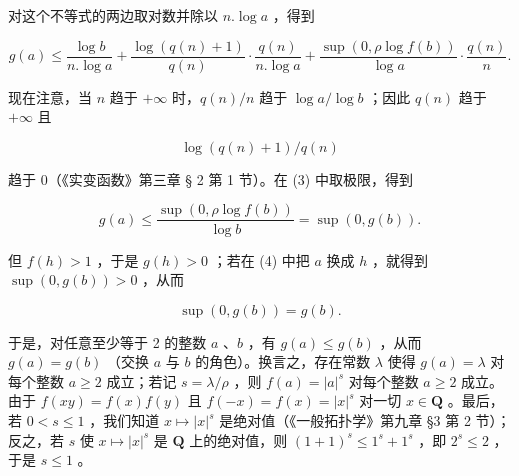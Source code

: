 对这个不等式的两边取对数并除以 \(n.\log a\) ，得到

\[
g (a) \leqslant \frac {\log b}{n . \log a} + \frac {\log (q (n) + 1)}{q (n)} \cdot \frac {q (n)}{n . \log a} + \frac {\sup (0 , \rho \log f (b))}{\log a} \cdot \frac {q (n)}{n}.\tag{3}
\]

现在注意，当 \(n\) 趋于 \(+\infty\) 时，\(q(n) / n\) 趋于 \(\log a / \log b\) ；因此 \(q(n)\) 趋于 \(+\infty\) 且

\[
\log (q (n) + 1) / q (n)
\]

趋于 0（《实变函数》第三章 § 2 第 1 节）。在 (3) 中取极限，得到

\[
g (a) \leqslant \frac {\sup (0 , \rho \log f (b))}{\log b} = \sup (0, g (b)).\tag{4}
\]

但 \(f(h) > 1\) ，于是 \(g(h) > 0\) ；若在 (4) 中把 \(a\) 换成 \(h\) ，就得到 \(\sup(0, g(b)) > 0\) ，从而

\[
\sup (0, g (b)) = g (b).
\]

于是，对任意至少等于 2 的整数 \(a\) 、\(b\) ，有 \(g(a) \leqslant g(b)\) ，从而 \(g(a) = g(b)\) （交换 \(a\) 与 \(b\) 的角色）。换言之，存在常数 \(\lambda\) 使得 \(g(a) = \lambda\) 对每个整数 \(a \geqslant 2\) 成立；若记 \(s = \lambda / \rho\) ，则 \(f(a) = |a|^s\) 对每个整数 \(a \geqslant 2\) 成立。由于 \(f(xy) = f(x)f(y)\) 且 \(f(-x) = f(x) = |x|^s\) 对一切 \(x \in \mathbf{Q}\) 。最后，若 \(0 < s \leqslant 1\) ，我们知道 \(x \mapsto |x|^s\) 是绝对值（《一般拓扑学》第九章 §3 第 2 节）；反之，若 \(s\) 使 \(x \mapsto |x|^s\) 是 \(\mathbf{Q}\) 上的绝对值，则 \((1 + 1)^s \leqslant 1^s + 1^s\) ，即 \(2^s \leqslant 2\) ，于是 \(s \leqslant 1\) 。

